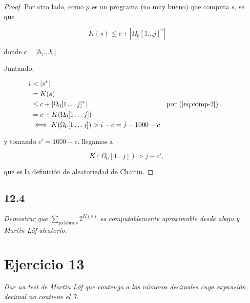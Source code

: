 \documentclass{article}
\theoremstyle{definition} %
\newcommand{\first}[2]{#2[1 \dots #1]}
\begin{document}
\begin{proof}
    Por otro lado, como $p$ es un programa (no muy bueno) que computa $s$, se que

    \begin{equation}\label{eq:comp-2}
         K(s) \leq c + |\first{j}{\Omega_0}^*|
    \end{equation}

    donde $c = |b_1 \dots b_c|$.

    Juntando,

    \begin{align*}
        i
            &< |s^*|\\
            &= K(s)\\
            &\leq c + |\first{j}{\Omega_0}^*|
                &&\text{por (\ref{eq:comp-2})} \\
            &= c + K(\first{j}{\Omega_0}) \\
            &\iff K(\first{j}{\Omega_0}) > i - c = j - 1000 - c
    \end{align*}

     y tomando $c' = 1000 -
c$, llegamos a

    \[
        K(\first{j}{\Omega_0}) > j - c',
    \]
    
    que es la definición de aleatoriedad de Chaitin.

\end{proof}

\subsection*{12.4}

\textit{Demostrar que $\sum_{\text{palabra s}} 2^{K(s)}$ es computablemente
aproximable desde abajo y Martin Löf aleatorio.}

\section*{Ejercicio 13}

\textit{Dar un test de Martin Löf que contenga a los números decimales cuya expansión decimal no contiene el 7.}
\end{document}
